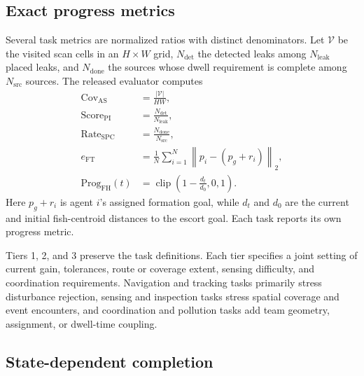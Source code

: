 \subsection{Exact progress metrics}

Several task metrics are normalized ratios with distinct denominators. Let $\mathcal V$ be the visited scan cells in an $H\times W$ grid, $N_{\mathrm{det}}$ the detected leaks among $N_{\mathrm{leak}}$ placed leaks, and $N_{\mathrm{done}}$ the sources whose dwell requirement is complete among $N_{\mathrm{src}}$ sources. The released evaluator computes
\begin{align}
\mathrm{Cov}_{\mathrm{AS}}
  &= \frac{|\mathcal V|}{HW}, \label{eq:as_progress}\\
\mathrm{Score}_{\mathrm{PI}}
  &= \frac{N_{\mathrm{det}}}{N_{\mathrm{leak}}}, \label{eq:pi_progress}\\
\mathrm{Rate}_{\mathrm{SPC}}
  &= \frac{N_{\mathrm{done}}}{N_{\mathrm{src}}}, \label{eq:spc_progress}\\
e_{\mathrm{FT}}
  &= \frac{1}{N}\sum_{i=1}^{N}
     \left\|p_i-(p_g+r_i)\right\|_2, \label{eq:ft_error}\\
\mathrm{Prog}_{\mathrm{FH}}(t)
  &= \operatorname{clip}\!\left(1-\frac{d_t}{d_0},0,1\right). \label{eq:fh_progress}
\end{align}
Here $p_g+r_i$ is agent $i$'s assigned formation goal, while $d_t$ and $d_0$ are the current and initial fish-centroid distances to the escort goal. Each task reports its own progress metric.

Tiers 1, 2, and 3 preserve the task definitions. Each tier specifies a joint setting of current gain, tolerances, route or coverage extent, sensing difficulty, and coordination requirements. Navigation and tracking tasks primarily stress disturbance rejection, sensing and inspection tasks stress spatial coverage and event encounters, and coordination and pollution tasks add team geometry, assignment, or dwell-time coupling.

\subsection{State-dependent completion}


